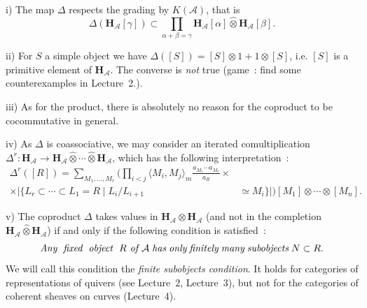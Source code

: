 \documentclass[a4paper,10pt]{amsart}
\def\H{\mathbf{H}}
\def\a{\alpha}
\def\b{\beta}
\def\ga{\gamma}
\def\A{\mathcal{A}}
\numberwithin{equation}{section}
\begin{document}
\vspace{.05in}

\noindent
i) The map $\Delta$ respects the grading by $K(\A)$, that is
$$\Delta (\H_{\A}[\ga]) \subset \prod_{\a+\b=\ga} \H_{\A}[\a] \widehat{\otimes} \H_{\A}[\b].$$

\vspace{.05in}

\noindent
ii) For $S$ a simple object we have $\Delta([S])=[S] \otimes 1 + 1 \otimes [S]$, i.e. $[S]$ is a primitive element of $\H_{\A}$. The converse is \textit{not} true (game~: find some counterexamples in Lecture~2.).

\vspace{.05in}

\noindent
iii) As for the product, there is absolutely no reason for the coproduct to be cocommutative in general.

\vspace{.05in}

\noindent
iv) As $\Delta$ is coassociative, we may consider an iterated comultiplication $\Delta^r: \H_{\A} \to
\H_{\A} \widehat{\otimes} \cdots \widehat{\otimes} \H_{\A}$, which has the following interpretation~:
\begin{equation*}
\begin{split}
\Delta^r([R])=\sum_{M_1, \ldots, M_r}  \big( \prod_{i<j} \langle M_i, M_j \rangle_m  \frac{a_{M_1} \cdots a_{M_r}}{a_R} \times &\\
\times \big| \big\{ L_r \subset \cdots \subset L_1=R\;|\; L_i/L_{i+1}& \simeq M_i\big\} \big| \big) [M_1] \otimes \cdots \otimes [M_n].
\end{split}
\end{equation*}

\vspace{.05in}

\noindent
v) The coproduct $\Delta$ takes values in $\H_{\A} \otimes \H_{\A}$ (and not in the completion $\H_{\A} \widehat{\otimes} \H_{\A}$) if and only if the following condition is satisfied~:
\begin{equation}\label{E:FS}
 \textit{Any \;fixed \;object \;$R$ of $\mathcal{A}$\;has\;only\;finitely\;many\;subobjects\;$N \subset R$}.
 \end{equation}
We will call this condition the \textit{finite subobjects condition}. It holds for categories of representations of quivers (see Lecture~2, Lecture~3), but not for the categories of coherent sheaves on curves (Lecture~4).

\vspace{.15in}
\end{document}
